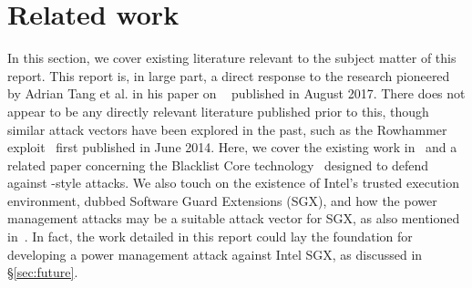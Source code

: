 \chapter{Related work}

In this section, we cover existing literature relevant to the subject matter of
this report. This report is, in large part, a direct response to the research
pioneered by Adrian Tang et al. in his paper on
\clkscrew{}~\cite{clkscrew} published in August 2017. There does not appear to
be any directly relevant literature published prior to this, though similar
attack vectors have been explored in the past, such as
the Rowhammer exploit~\cite{rowhammer} first published in June 2014. Here, we
cover the existing work in~\cite{clkscrew} and a related paper
concerning the Blacklist Core technology~\cite{blacklistCore} designed to
defend against \clkscrew{}-style attacks. We also touch on the existence of
Intel's trusted execution environment, dubbed Software Guard Extensions (SGX),
and how the power management attacks may be a suitable attack vector for SGX, as also
mentioned in~\cite{securityOfSGX}. In fact, the work detailed in this report
could lay the foundation for developing a power management attack against
Intel SGX, as discussed in §\ref{sec:future}.






